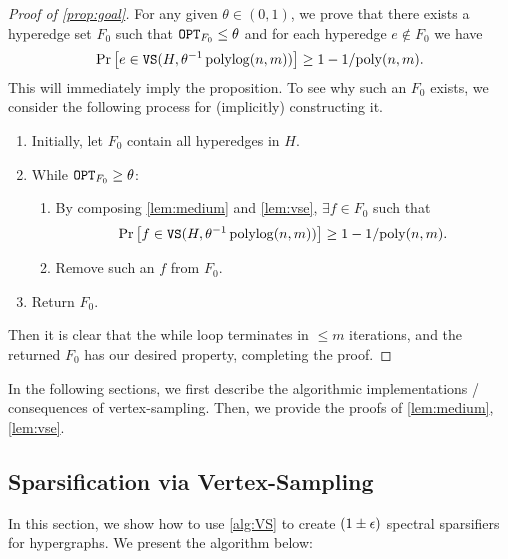 \documentclass{article}
\begin{document}
\begin{proof}[Proof of \cref{prop:goal}]
    \label{proof:thm1}{}
    For any given $\theta\in (0,1)$,
    we prove that there exists
    a hyperedge set $F_0$ such that
    $\mathtt{OPT}_{F_0} \leq \theta$
    and for each hyperedge $e\notin F_0$ we have
    \begin{align*}
            \mathrm{Pr}\left[ e\in \mathtt{VS}(H, \theta^{-1}\operatorname{polylog}(n,m)) \right]
            \geq 1 - 1/\mathrm{poly}(n,m).
        \end{align*}
    This will immediately imply the proposition.
    To see why such an $F_0$ exists, we consider
    the following process for (implicitly) constructing it.
    \begin{enumerate}
        \item Initially, let $F_0$ contain all hyperedges in $H$.
        \item While $\mathtt{OPT}_{F_0} \geq \theta$:
        \begin{enumerate}
            \item By composing \cref{lem:medium} and \cref{lem:vse},
            $\exists f\in F_0$ such that
            \begin{align*}
            \mathrm{Pr}\left[ f\in \mathtt{VS}(H, \theta^{-1}\operatorname{polylog}(n,m)) \right]
            \geq 1 - 1/\mathrm{poly}(n,m).
        \end{align*}
        \item Remove such an $f$ from $F_0$.
        \end{enumerate}
        \item Return $F_0$.
    \end{enumerate}
    Then it is clear that the while loop terminates in $\leq m$ iterations,
    and the returned $F_0$ has our desired property, completing the proof.
\end{proof}


In the following sections, we first describe the algorithmic implementations / consequences of vertex-sampling. Then, we provide the proofs of \cref{lem:medium}, \cref{lem:vse}.

\subsection{Sparsification via Vertex-Sampling}

In this section, we show how to use \cref{alg:VS} to create $(1 \pm \epsilon)$ spectral sparsifiers for hypergraphs. We present the algorithm below:

\sparsifyov*
\end{document}
